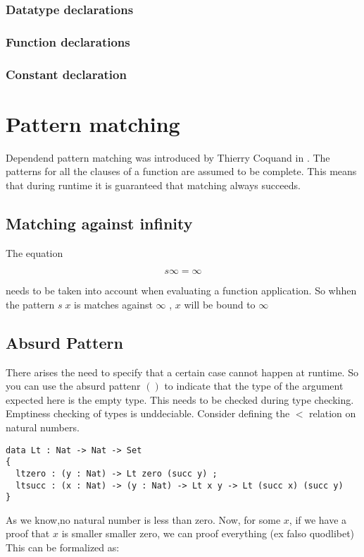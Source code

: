 \subsubsection{Datatype declarations}
\subsubsection{Function declarations}

\subsubsection{Constant declaration}

\section{Pattern matching}
Dependend pattern matching was introduced by Thierry Coquand in \cite{coquand92pattern}.
The patterns for all the clauses of a function are assumed to be complete. This means that during runtime
it is guaranteed that matching always succeeds.

\subsection{Matching against infinity}
The equation 

\[ s \infty = \infty \]

needs to be taken into account when evaluating a function application.
So whhen the pattern $ s \; x $ is matches against $ \infty $ , $x$ will be bound to $ \infty $  

\subsection{Absurd Pattern}
There arises the need to specify that a certain case cannot happen at runtime.
So you can use the absurd pattenr $ () $ to indicate that the type of the argument expected here is the empty type.
This needs to be checked during type checking. Emptiness checking of types is unddeciable.
Consider defining the $ < $ relation on natural numbers.

\begin{verbatim}
data Lt : Nat -> Nat -> Set
{
  ltzero : (y : Nat) -> Lt zero (succ y) ;
  ltsucc : (x : Nat) -> (y : Nat) -> Lt x y -> Lt (succ x) (succ y)
}

\end{verbatim}

As we know,no natural number is less than zero.
Now, for some $x$, if we have a proof that $x$ is smaller smaller zero, we can proof everything (ex falso quodlibet)
This can be formalized as:

